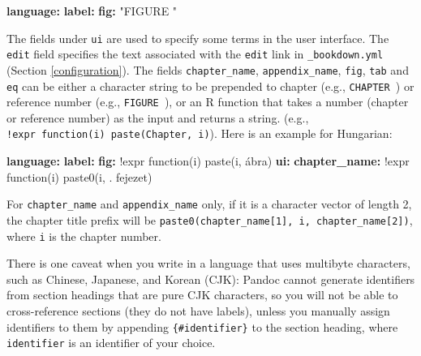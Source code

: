 \documentclass[
  12pt,
]{krantz}
\newenvironment{Shaded}{\begin{snugshade}}{\end{snugshade}}
\newcommand{\AttributeTok}[1]{\textcolor[rgb]{0.13,0.29,0.53}{#1}}
\newcommand{\FunctionTok}[1]{\textcolor[rgb]{0.13,0.29,0.53}{\textbf{#1}}}
\newcommand{\KeywordTok}[1]{\textcolor[rgb]{0.13,0.29,0.53}{\textbf{#1}}}
\newcommand{\StringTok}[1]{\textcolor[rgb]{0.31,0.60,0.02}{#1}}
\begin{document}
\begin{Shaded}
\begin{Highlighting}[]
\FunctionTok{language}\KeywordTok{:}
\AttributeTok{  }\FunctionTok{label}\KeywordTok{:}
\AttributeTok{    }\FunctionTok{fig}\KeywordTok{:}\AttributeTok{ }\StringTok{"FIGURE "}
\end{Highlighting}
\end{Shaded}

The fields under \texttt{ui} are used to specify some terms in the user interface. The \texttt{edit} field specifies the text associated with the \texttt{edit} link in \texttt{\_bookdown.yml} (Section \ref{configuration}). The fields \texttt{chapter\_name}, \texttt{appendix\_name}, \texttt{fig}, \texttt{tab} and \texttt{eq} can be either a character string to be prepended to chapter (e.g., \texttt{\textquotesingle{}CHAPTER\ \textquotesingle{}}) or reference number (e.g., \texttt{\textquotesingle{}FIGURE\ \textquotesingle{}}), or an R function that takes a number (chapter or reference number) as the input and returns a string. (e.g., \texttt{!expr\ function(i)\ paste(\textquotesingle{}Chapter\textquotesingle{},\ i)}). Here is an example for Hungarian:

\begin{Shaded}
\begin{Highlighting}[]
\FunctionTok{language}\KeywordTok{:}
\AttributeTok{  }\FunctionTok{label}\KeywordTok{:}
\AttributeTok{    }\FunctionTok{fig}\KeywordTok{:}\AttributeTok{ !expr function(i) paste(i, \textquotesingle{}ábra\textquotesingle{})}
\AttributeTok{  }\FunctionTok{ui}\KeywordTok{:}
\AttributeTok{    }\FunctionTok{chapter\_name}\KeywordTok{:}\AttributeTok{ !expr function(i) paste0(i, \textquotesingle{}. fejezet\textquotesingle{})}
\end{Highlighting}
\end{Shaded}

For \texttt{chapter\_name} and \texttt{appendix\_name} only, if it is a character vector of length 2, the chapter title prefix will be \texttt{paste0(chapter\_name{[}1{]},\ i,\ chapter\_name{[}2{]})}, where \texttt{i} is the chapter number.

There is one caveat when you write in a language that uses multibyte characters, such as Chinese, Japanese, and Korean (CJK): Pandoc cannot generate identifiers from section headings that are pure CJK characters, so you will not be able to cross-reference sections (they do not have labels), unless you manually assign identifiers to them by appending \texttt{\{\#identifier\}} to the section heading, where \texttt{identifier} is an identifier of your choice.

  

\printindex
\end{document}
